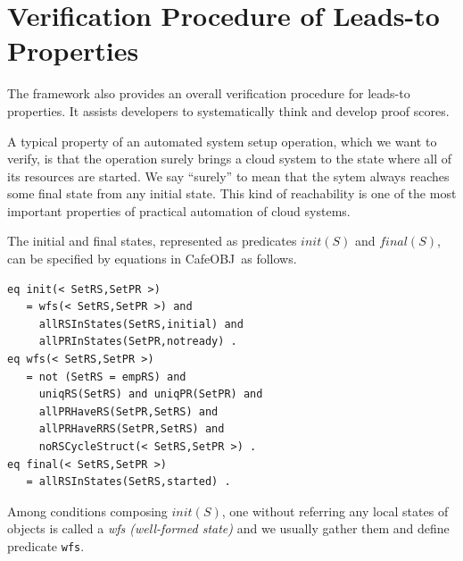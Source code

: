 \documentclass[12pt]{report}
\newcommand{\cafeobj}{{\sf CafeOBJ}~}
\begin{document}
\chapter{Verification Procedure of Leads-to Properties}
\label{chap:verification}
The framework also provides an overall verification procedure for
leads-to properties. It assists developers to systematically think and
develop proof scores.

A typical property of an automated system setup operation, which we
want to verify, is that the operation surely brings a cloud system to
the state where all of its resources are started.  We say ``surely''
to mean that the sytem always reaches some final state from any
initial state.  This kind of reachability is one of the most important
properties of practical automation of cloud systems.

The initial and final states, represented as predicates $init(S)$
and $final(S)$, can be specified by equations in \cafeobj as
follows.
\begin{verbatim}
eq init(< SetRS,SetPR >)
   = wfs(< SetRS,SetPR >) and
     allRSInStates(SetRS,initial) and 
     allPRInStates(SetPR,notready) .
eq wfs(< SetRS,SetPR >)
   = not (SetRS = empRS) and 
     uniqRS(SetRS) and uniqPR(SetPR) and 
     allPRHaveRS(SetPR,SetRS) and 
     allPRHaveRRS(SetPR,SetRS) and
     noRSCycleStruct(< SetRS,SetPR >) .
eq final(< SetRS,SetPR >)
   = allRSInStates(SetRS,started) .
\end{verbatim}
Among conditions composing $init(S)$, one without referring any local
states of objects is called a {\it wfs (well-formed state)} and we
usually gather them and define predicate {\tt wfs}.
\end{document}
